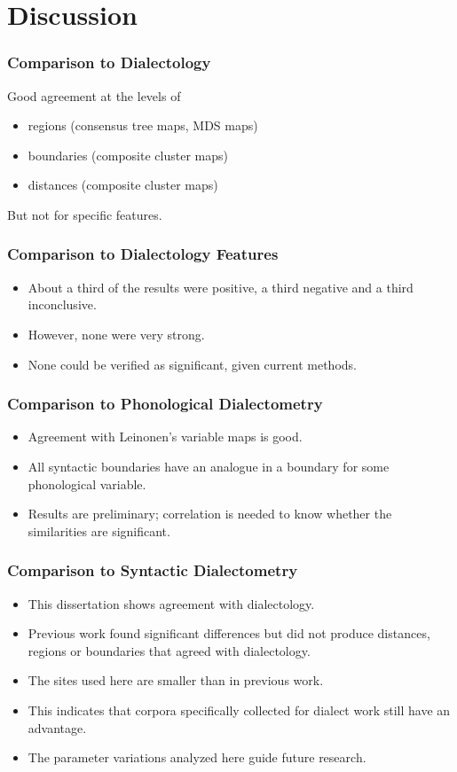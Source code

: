 \documentclass{beamer}
\begin{document}
\section{Discussion}
\begin{frame}
  \frametitle{Comparison to Dialectology}
  Good agreement at the levels of
  \begin{itemize}
  \item regions (consensus tree maps, MDS maps)
  \item boundaries (composite cluster maps)
  \item distances (composite cluster maps)
  \end{itemize}
  But not for specific features.
\end{frame}
\begin{frame}
  \frametitle{Comparison to Dialectology Features}
  \begin{itemize}
 \item About a third of the results were positive, a third negative
    and a third inconclusive.
  \item However, none were very strong.
  \item None could be verified as significant, given current methods.
  \end{itemize}
\end{frame}
\begin{frame}
  \frametitle{Comparison to Phonological Dialectometry}
  \begin{itemize}
 \item Agreement with Leinonen's variable maps is good.
 \item All syntactic boundaries have an analogue in a boundary for
   some phonological variable.
  \item Results are preliminary; correlation is needed to know whether
    the similarities are significant.
  \end{itemize}
\end{frame}
\begin{frame}
  \frametitle{Comparison to Syntactic Dialectometry}
  \begin{itemize}
  \item This dissertation shows agreement with dialectology.
  \item Previous work found significant differences but did not
    produce distances, regions or boundaries that agreed with
    dialectology.
  \item The sites used here are smaller than in previous work.
  \item This indicates that corpora specifically collected for dialect
    work still have an advantage.
 \item The parameter variations analyzed here guide future research.
 \end{itemize}
\end{frame}
\end{document}
